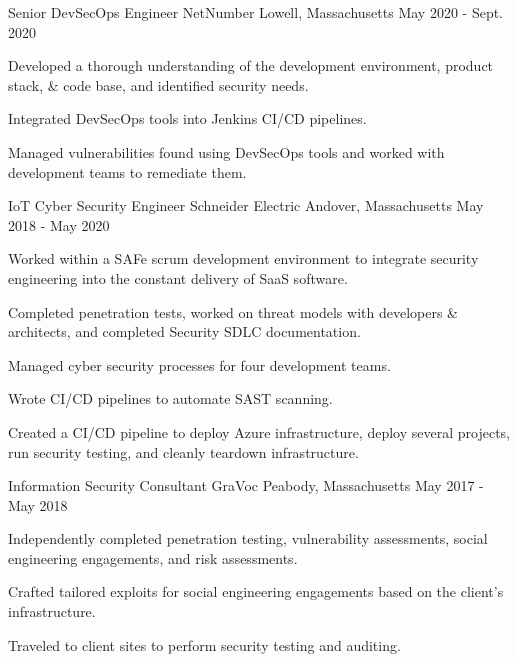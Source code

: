 \begin{cventries}
  \cventry
    {Senior DevSecOps Engineer} %
    {NetNumber} %
    {Lowell, Massachusetts} %
    {May 2020 - Sept. 2020} %
    {
      \begin{cvitems} %
        \item {
            Developed a thorough understanding of the development environment, product stack, \& code base, and identified security needs.
        }
        \item {
            Integrated DevSecOps tools into Jenkins CI/CD pipelines.
        }
        \item {
            Managed vulnerabilities found using DevSecOps tools and worked with development teams to remediate them.
        }
      \end{cvitems}
    }

  \cventry
    {IoT Cyber Security Engineer} %
    {Schneider Electric} %
    {Andover, Massachusetts} %
    {May 2018 - May 2020} %
    {
      \begin{cvitems} %
        \item {
            Worked within a SAFe scrum development environment to integrate security engineering into the constant delivery of SaaS software.
        }
        \item {
            Completed penetration tests, worked on threat models with developers \& architects, and completed Security SDLC documentation.
        }
        \item {
            Managed cyber security processes for four development teams.
        }
        \item {
            Wrote CI/CD pipelines to automate SAST scanning.
        }
        \item {
            Created a CI/CD pipeline to deploy Azure infrastructure, deploy several projects, run security testing, and cleanly teardown infrastructure.
        }
      \end{cvitems}
    }

  \cventry
    {Information Security Consultant} %
    {GraVoc} %
    {Peabody, Massachusetts} %
    {May 2017 - May 2018} %
    {
      \begin{cvitems} %
        \item {
            Independently completed penetration testing, vulnerability assessments, social engineering engagements, and risk assessments.
        }
        \item {
            Crafted tailored exploits for social engineering engagements based on the client's infrastructure.
        }
        \item {
            Traveled to client sites to perform security testing and auditing.
        }
      \end{cvitems}
    }


\end{cventries}
